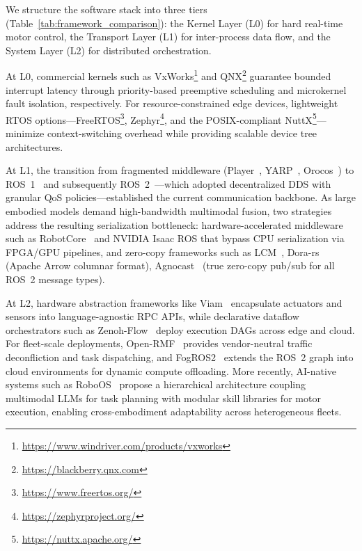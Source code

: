 \documentclass[acmsmall,screen,review,anonymous]{acmart}
\begin{document}
We structure the software stack into three tiers (Table~\ref{tab:framework_comparison}): the Kernel Layer (L0) for hard real-time motor control, the Transport Layer (L1) for inter-process data flow, and the System Layer (L2) for distributed orchestration.

At L0, commercial kernels such as VxWorks\footnote{\url{https://www.windriver.com/products/vxworks}} and QNX\footnote{\url{https://blackberry.qnx.com}} guarantee bounded interrupt latency through priority-based preemptive scheduling and microkernel fault isolation, respectively. For resource-constrained edge devices, lightweight RTOS options---FreeRTOS\footnote{\url{https://www.freertos.org/}}, Zephyr\footnote{\url{https://zephyrproject.org/}}, and the POSIX-compliant NuttX\footnote{\url{https://nuttx.apache.org/}}---minimize context-switching overhead while providing scalable device tree architectures.

At L1, the transition from fragmented middleware (Player~\cite{gerkey2001player}, YARP~\cite{metta2006yarp}, Orocos~\cite{bruyninckx2001open}) to ROS~1~\cite{quigley2009ros} and subsequently ROS~2~\cite{macenski2022robot}---which adopted decentralized DDS with granular QoS policies---established the current communication backbone.
As large embodied models demand high-bandwidth multimodal fusion, two strategies address the resulting serialization bottleneck: hardware-accelerated middleware such as RobotCore~\cite{mayoral2022robotcore} and NVIDIA Isaac ROS that bypass CPU serialization via FPGA/GPU pipelines, and zero-copy frameworks such as LCM~\cite{huang2010lcm}, Dora-rs~\cite{han2024dora} (Apache Arrow columnar format), Agnocast~\cite{ishikawa2025agnocast} (true zero-copy pub/sub for all ROS~2 message types).

At L2, hardware abstraction frameworks like Viam~\cite{viam2022} encapsulate actuators and sensors into language-agnostic RPC APIs, while declarative dataflow orchestrators such as Zenoh-Flow~\cite{zenoh2024} deploy execution DAGs across edge and cloud. For fleet-scale deployments, Open-RMF~\cite{openrmf2021} provides vendor-neutral traffic deconfliction and task dispatching, and FogROS2~\cite{ichnowski2022fogros2} extends the ROS~2 graph into cloud environments for dynamic compute offloading. More recently, AI-native systems such as RoboOS~\cite{wang2025roboos} propose a hierarchical architecture coupling multimodal LLMs for task planning with modular skill libraries for motor execution, enabling cross-embodiment adaptability across heterogeneous fleets.
\end{document}
